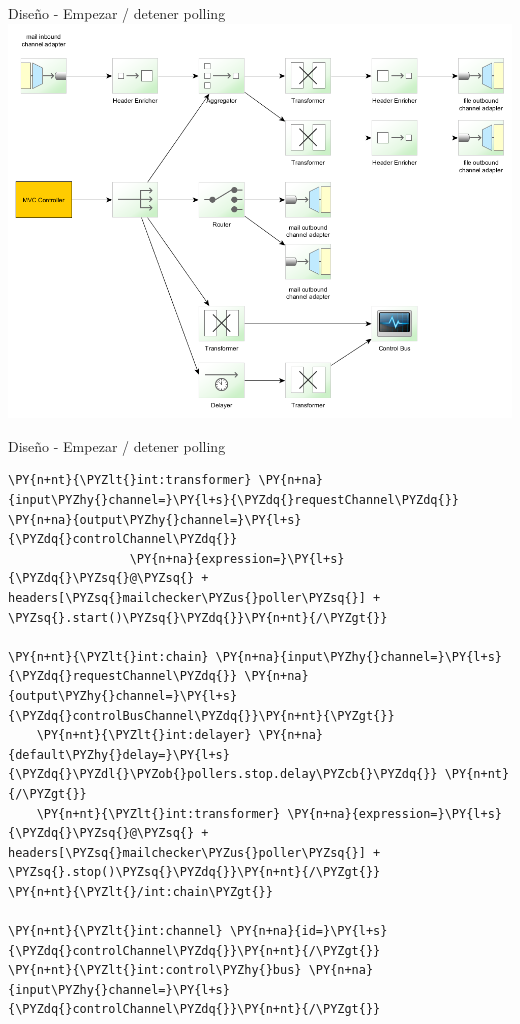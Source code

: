 \documentclass{beamer}
\begin{document}
\begin{frame}{Diseño - Empezar / detener polling}
\includegraphics[width=0.8\linewidth]{sp-int-14a}
\end{frame}

\begin{frame}[fragile]{Diseño - Empezar / detener polling}
\begin{Verbatim}[fontsize=\tiny,commandchars=\\\{\}]
\PY{n+nt}{\PYZlt{}int:transformer} \PY{n+na}{input\PYZhy{}channel=}\PY{l+s}{\PYZdq{}requestChannel\PYZdq{}} \PY{n+na}{output\PYZhy{}channel=}\PY{l+s}{\PYZdq{}controlChannel\PYZdq{}}
                 \PY{n+na}{expression=}\PY{l+s}{\PYZdq{}\PYZsq{}@\PYZsq{} + headers[\PYZsq{}mailchecker\PYZus{}poller\PYZsq{}] + \PYZsq{}.start()\PYZsq{}\PYZdq{}}\PY{n+nt}{/\PYZgt{}}

\PY{n+nt}{\PYZlt{}int:chain} \PY{n+na}{input\PYZhy{}channel=}\PY{l+s}{\PYZdq{}requestChannel\PYZdq{}} \PY{n+na}{output\PYZhy{}channel=}\PY{l+s}{\PYZdq{}controlBusChannel\PYZdq{}}\PY{n+nt}{\PYZgt{}}
    \PY{n+nt}{\PYZlt{}int:delayer} \PY{n+na}{default\PYZhy{}delay=}\PY{l+s}{\PYZdq{}\PYZdl{}\PYZob{}pollers.stop.delay\PYZcb{}\PYZdq{}} \PY{n+nt}{/\PYZgt{}}
    \PY{n+nt}{\PYZlt{}int:transformer} \PY{n+na}{expression=}\PY{l+s}{\PYZdq{}\PYZsq{}@\PYZsq{} + headers[\PYZsq{}mailchecker\PYZus{}poller\PYZsq{}] + \PYZsq{}.stop()\PYZsq{}\PYZdq{}}\PY{n+nt}{/\PYZgt{}}
\PY{n+nt}{\PYZlt{}/int:chain\PYZgt{}}

\PY{n+nt}{\PYZlt{}int:channel} \PY{n+na}{id=}\PY{l+s}{\PYZdq{}controlChannel\PYZdq{}}\PY{n+nt}{/\PYZgt{}}
\PY{n+nt}{\PYZlt{}int:control\PYZhy{}bus} \PY{n+na}{input\PYZhy{}channel=}\PY{l+s}{\PYZdq{}controlChannel\PYZdq{}}\PY{n+nt}{/\PYZgt{}}
\end{Verbatim}
\end{frame}
\end{document}
